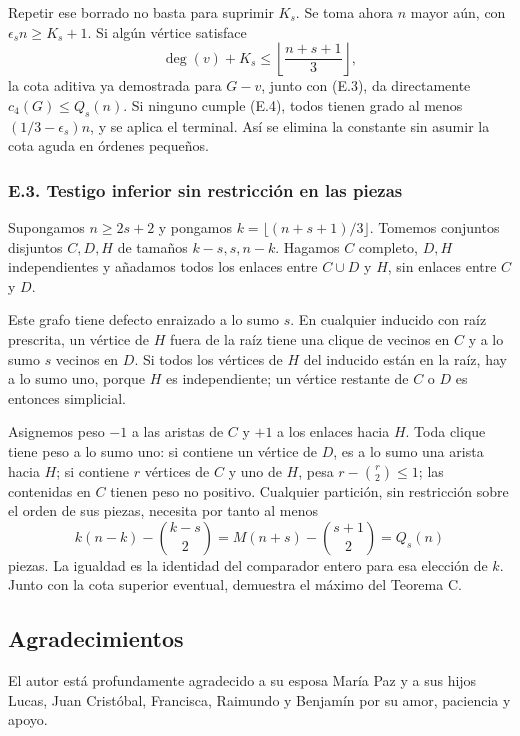 \documentclass[spanish,11pt,a4paper]{article}
\begin{document}
Repetir ese borrado no basta para suprimir \(K_s\). Se toma ahora \(n\) mayor aún, con \(\epsilon_s n\ge K_s+1\). Si algún vértice satisface \[
\deg(v)+K_s\le\left\lfloor\frac{n+s+1}{3}\right\rfloor,
\tag{E.4}
\] la cota aditiva ya demostrada para \(G-v\), junto con (E.3), da directamente \(c_4(G)\le Q_s(n)\). Si ninguno cumple (E.4), todos tienen grado al menos \((1/3-\epsilon_s)n\), y se aplica el terminal. Así se elimina la constante sin asumir la cota aguda en órdenes pequeños.

\subsubsection{E.3. Testigo inferior sin restricción en las piezas}\label{e.3.-testigo-inferior-sin-restriccion-en-las-piezas}

Supongamos \(n\ge2s+2\) y pongamos \(k=\lfloor(n+s+1)/3\rfloor\). Tomemos conjuntos disjuntos \(C,D,H\) de tamaños \(k-s,s,n-k\). Hagamos \(C\) completo, \(D,H\) independientes y añadamos todos los enlaces entre \(C\cup D\) y \(H\), sin enlaces entre \(C\) y \(D\).

Este grafo tiene defecto enraizado a lo sumo \(s\). En cualquier inducido con raíz prescrita, un vértice de \(H\) fuera de la raíz tiene una clique de vecinos en \(C\) y a lo sumo \(s\) vecinos en \(D\). Si todos los vértices de \(H\) del inducido están en la raíz, hay a lo sumo uno, porque \(H\) es independiente; un vértice restante de \(C\) o \(D\) es entonces simplicial.

Asignemos peso \(-1\) a las aristas de \(C\) y \(+1\) a los enlaces hacia \(H\). Toda clique tiene peso a lo sumo uno: si contiene un vértice de \(D\), es a lo sumo una arista hacia \(H\); si contiene \(r\) vértices de \(C\) y uno de \(H\), pesa \(r-\binom r2\le1\); las contenidas en \(C\) tienen peso no positivo. Cualquier partición, sin restricción sobre el orden de sus piezas, necesita por tanto al menos \[
k(n-k)-\binom{k-s}{2}
=M(n+s)-\binom{s+1}{2}=Q_s(n)
\tag{E.5}
\] piezas. La igualdad es la identidad del comparador entero para esa elección de \(k\). Junto con la cota superior eventual, demuestra el máximo del Teorema C.

\subsection{Agradecimientos}\label{agradecimientos}

El autor está profundamente agradecido a su esposa María Paz y a sus hijos Lucas, Juan Cristóbal, Francisca, Raimundo y Benjamín por su amor, paciencia y apoyo.
\end{document}
